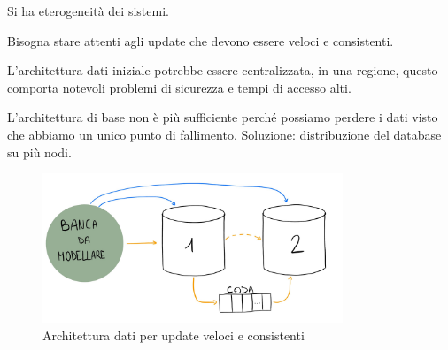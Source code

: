 Si ha eterogeneità dei sistemi.

Bisogna stare attenti agli update che devono essere veloci e consistenti.

L'architettura dati iniziale potrebbe essere centralizzata, in una regione, 
questo comporta notevoli problemi di sicurezza e tempi di accesso alti. 

L'architettura di base non è più sufficiente perché possiamo perdere i dati visto
che abbiamo un unico punto di fallimento. Soluzione: distribuzione del database
su più nodi.
\begin{figure}[!ht]
    \centering
    \includegraphics[width=0.8\textwidth]{./img/modellazione_banca.jpg}
    \caption{Architettura dati per update veloci e consistenti}
    \label{fig:esBanca}
\end{figure}

